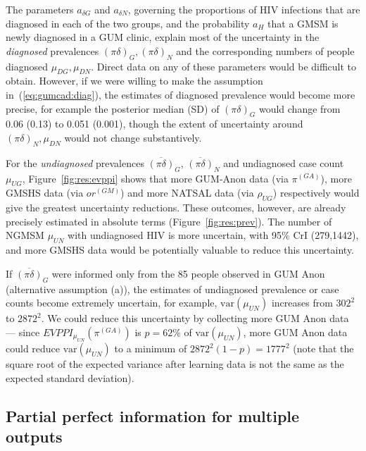 \documentclass[12pt]{article}\usepackage[]{graphicx}\usepackage[]{color}
\newcommand{\var}{\mbox{var}}
\newcommand{\pinodelta}{\overline{(\pi\delta)}}
\newcommand{\pidelta}{(\pi\delta)}
\begin{document}
The parameters $a_{\delta G}$ and $a_{\delta N}$, governing the proportions of HIV infections that are diagnosed in each of the two groups, and the probability $a_H$ that a GMSM is newly diagnosed in a GUM clinic, explain most of the uncertainty in the \emph{diagnosed} prevalences $\pidelta_G,\pidelta_N$ and the corresponding numbers of people diagnosed $\mu_{DG},\mu_{DN}$.  Direct data on any of these parameters would be difficult to obtain.   However, if we were willing to make the assumption in~(\ref{eq:gumcad:diag}), the estimates of diagnosed prevalence would become more precise, for example the posterior median (SD) of $\pidelta_G$ would change from
0.06 (0.13) 
to
0.051 (0.001), though the extent of uncertainty around $\pidelta_N,\mu_{DN}$ would not change substantively. 


For the \emph{undiagnosed} prevalences $\pinodelta_G$, $\pinodelta_N$ and undiagnosed case count $\mu_{UG}$, Figure~\ref{fig:res:evppi} shows that more GUM-Anon data (via $\pi^{(GA)}$), more GMSHS data (via $or^{(GM)}$) and more NATSAL data (via $\rho_{UG}$) respectively would give the greatest uncertainty reductions.  These outcomes, however, are already precisely estimated in absolute terms (Figure~\ref{fig:res:prev}).    The number of NGMSM $\mu_{UN}$ with undiagnosed HIV is more uncertain, with 95\% CrI (279,1442), and more GMSHS data would be potentially valuable to reduce this uncertainty.

If $\pinodelta_G$ were informed only from the \iftoggle{nodata}{}{4 infections out of }85 people observed in GUM Anon (alternative assumption (a)), the estimates of undiagnosed prevalence or case counts become extremely uncertain, for example, $\var(\mu_{UN})$ increases from $302^2$ to $2872^2$.  We could reduce this uncertainty by collecting more GUM Anon data --- since $EVPPI_{\mu_{UN}}(\pi^{(GA)})$ is $p=62\%$ of $\var(\mu_{UN})$, more GUM Anon data could reduce $\var(\mu_{UN})$ to a minimum of $2872^2(1 - p) = 1777^2$  (note that the square root of the expected variance after learning data is not the same as the expected standard deviation).

\subsection{Partial perfect information for multiple outputs}
\end{document}
